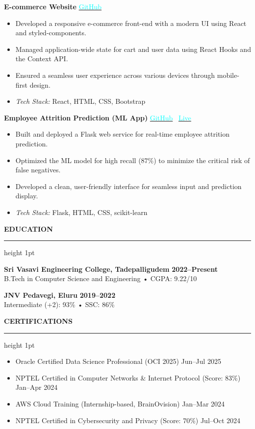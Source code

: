 \documentclass[10pt,a4paper]{article}
\newenvironment{tightitemize}{
  \begin{itemize}[leftmargin=25pt, itemsep=2pt, parsep=2pt, topsep=2pt, partopsep=0pt]
  \addtolength{\leftskip}{14pt} %
}{
  \end{itemize}
}
\newcommand{\compactspace}{\vspace{5pt}}
\newcommand{\sectiongap}{\vspace{10pt}}
\newcommand{\resumesection}[1]{
    \sectiongap
    {\color{primary} \large \textbf{#1}} \\
    \hrule height 1pt \compactspace
}
\begin{document}
\textbf{E-commerce Website} \hfill  
\href{https://github.com/AbhiAnantapalli215/amazon-clone}{\textcolor{cyan}{GitHub}}
\begin{tightitemize}
    \item Developed a responsive e-commerce front-end with a modern UI using React and styled-components.
    \item Managed application-wide state for cart and user data using React Hooks and the Context API.
    \item Ensured a seamless user experience across various devices through mobile-first design.
    \item \textit{Tech Stack:} React, HTML, CSS, Bootstrap
\end{tightitemize}

\textbf{Employee Attrition Prediction (ML App)} \hfill  
\href{https://github.com/AbhiAnantapalli215/EmployeeAttritionPrediction}{\textcolor{cyan}{GitHub}} \textbar\  
\href{https://empattritionprediction.onrender.com}{\textcolor{cyan}{Live}}
\begin{tightitemize}
    \item Built and deployed a Flask web service for real-time employee attrition prediction.
    \item Optimized the ML model for high recall ($87\%$) to minimize the critical risk of false negatives.
    \item Developed a clean, user-friendly interface for seamless input and prediction display.
    \item \textit{Tech Stack:} Flask, HTML, CSS, scikit-learn
\end{tightitemize}

\resumesection{EDUCATION}
\textbf{Sri Vasavi Engineering College, Tadepalligudem} \hfill \textbf{2022--Present} \\
\indent B.Tech in Computer Science and Engineering • CGPA: 9.22/10  \compactspace

\textbf{JNV Pedavegi, Eluru} \hfill \textbf{2019--2022} \\
\indent Intermediate (+2): 93\% • SSC: 86\%

\resumesection{CERTIFICATIONS}
\begin{itemize}
    \item Oracle Certified Data Science Professional (OCI 2025) \hfill Jun--Jul 2025
    \item NPTEL Certified in Computer Networks \& Internet Protocol (Score: 83\%) \hfill Jan--Apr 2024
    \item AWS Cloud Training (Internship-based, BrainOvision) \hfill Jan--Mar 2024
    \item NPTEL Certified in Cybersecurity and Privacy (Score: 70\%) \hfill Jul--Oct 2024
\end{itemize}
\end{document}
